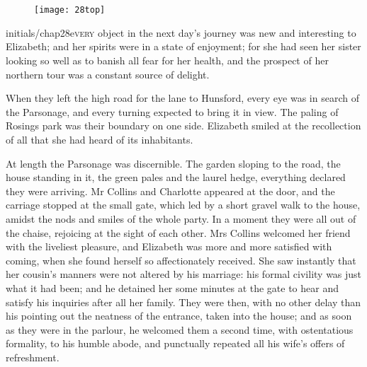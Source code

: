 \chapter[Chapter \thechapter]{}


\begin{figure}[t!]
\centering
\texttt{[image: 28top]}
\end{figure}


\lettrine[lines=6,image=true]{initials/chap28e}{very}  object in the next day's journey was new and interesting to Elizabeth; and her spirits were in a state of enjoyment; for she had seen her sister looking so well as to banish all fear for her health, and the prospect of her northern tour was a constant source of delight.

\zz
When they left the high road for the lane to Hunsford, every eye was in search of the Parsonage, and every turning expected to bring it in view. The paling of Rosings park was their boundary on one side. Elizabeth smiled at the recollection of all that she had heard of its inhabitants.

At length the Parsonage was discernible. The garden sloping to the road, the house standing in it, the green pales and the laurel hedge, everything declared they were arriving. Mr Collins and Charlotte appeared at the door, and the carriage stopped at the small gate, which led by a short gravel walk to the house, amidst the nods and smiles of the whole party. In a moment they were all out of the chaise, rejoicing at the sight of each other. Mrs Collins welcomed her friend with the liveliest pleasure, and Elizabeth was more and more satisfied with coming, when she found herself so affectionately received. She saw instantly that her cousin's manners were not altered by his marriage: his formal civility was just what it had been; and he detained her some minutes at the gate to hear and satisfy his inquiries after all her family. They were then, with no other delay than his pointing out the neatness of the entrance, taken into the house; and as soon as they were in the parlour, he welcomed them a second time, with ostentatious formality, to his humble abode, and punctually repeated all his wife's offers of refreshment.

